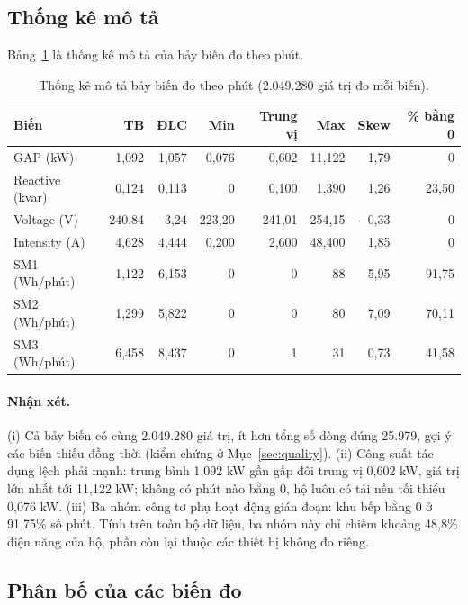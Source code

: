 \subsection{Thống kê mô tả}
Bảng~\ref{tab:describe} là thống kê mô tả của bảy biến đo theo phút.

\begin{table}[htbp]
    \centering
    \caption{Thống kê mô tả bảy biến đo theo phút (2.049.280 giá trị đo mỗi biến).}
    \label{tab:describe}
    \small
    \begin{tabular}{|l|r|r|r|r|r|r|r|}
        \hline
        \textbf{Biến} & \textbf{TB} & \textbf{ĐLC} & \textbf{Min} & \textbf{Trung vị} & \textbf{Max} & \textbf{Skew} & \textbf{\% bằng 0} \\ \hline
        GAP (kW) & 1,092 & 1,057 & 0,076 & 0,602 & 11,122 & 1,79 & 0 \\ \hline
        Reactive (kvar) & 0,124 & 0,113 & 0 & 0,100 & 1,390 & 1,26 & 23,50 \\ \hline
        Voltage (V) & 240,84 & 3,24 & 223,20 & 241,01 & 254,15 & $-$0,33 & 0 \\ \hline
        Intensity (A) & 4,628 & 4,444 & 0,200 & 2,600 & 48,400 & 1,85 & 0 \\ \hline
        SM1 (Wh/phút) & 1,122 & 6,153 & 0 & 0 & 88 & 5,95 & 91,75 \\ \hline
        SM2 (Wh/phút) & 1,299 & 5,822 & 0 & 0 & 80 & 7,09 & 70,11 \\ \hline
        SM3 (Wh/phút) & 6,458 & 8,437 & 0 & 1 & 31 & 0,73 & 41,58 \\ \hline
    \end{tabular}
\end{table}

\paragraph{Nhận xét.} (i) Cả bảy biến có cùng 2.049.280 giá trị, ít hơn tổng số dòng đúng 25.979, gợi ý các biến thiếu đồng thời (kiểm chứng ở Mục~\ref{sec:quality}). (ii) Công suất tác dụng lệch phải mạnh: trung bình 1,092 kW gần gấp đôi trung vị 0,602 kW, giá trị lớn nhất tới 11,122 kW; không có phút nào bằng 0, hộ luôn có tải nền tối thiểu 0,076 kW. (iii) Ba nhóm công tơ phụ hoạt động gián đoạn: khu bếp bằng 0 ở 91,75\% số phút. Tính trên toàn bộ dữ liệu, ba nhóm này chỉ chiếm khoảng 48,8\% điện năng của hộ, phần còn lại thuộc các thiết bị không đo riêng.

\subsection{Phân bố của các biến đo}

